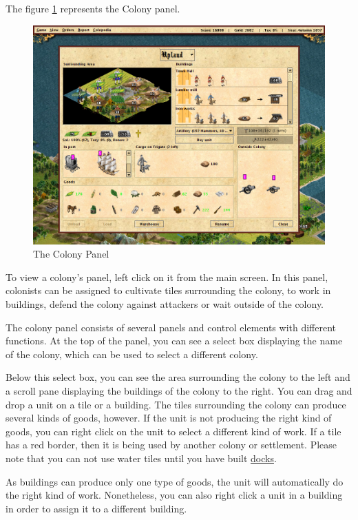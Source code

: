 \documentclass[12pt]{book}
\begin{document}
The figure \ref{colony_panel_fig} represents the Colony panel.
\begin{figure}[htb]
  \begin{center}
    \includegraphics[scale=0.35]{images/colony_panel.png}
    \caption{The Colony Panel\label{colony_panel_fig}}
  \end{center}
\end{figure}

To view a colony's panel, left click on it from the main screen. In
this panel, colonists can be assigned to cultivate tiles surrounding
the colony, to work in buildings, defend the colony against attackers
or wait outside of the colony.

The colony panel consists of several panels and control elements with
different functions. At the top of the panel, you can see a select box
displaying the name of the colony, which can be used to select a
different colony.

Below this select box, you can see the area surrounding the colony to
the left and a scroll pane displaying the buildings of the colony to
the right. You can drag and drop a unit on a tile or a building. The
tiles surrounding the colony can produce several kinds of goods,
however. If the unit is not producing the right kind of goods, you can
right click on the unit to select a different kind of work. If a tile
has a red border, then it is being used by another colony or
settlement. Please note that you can not use water tiles until you
have built \hyperlink{Dock}{docks}.

As buildings can produce only one type of goods, the unit will
automatically do the right kind of work. Nonetheless, you can also
right click a unit in a building in order to assign it to a different
building.
\end{document}

